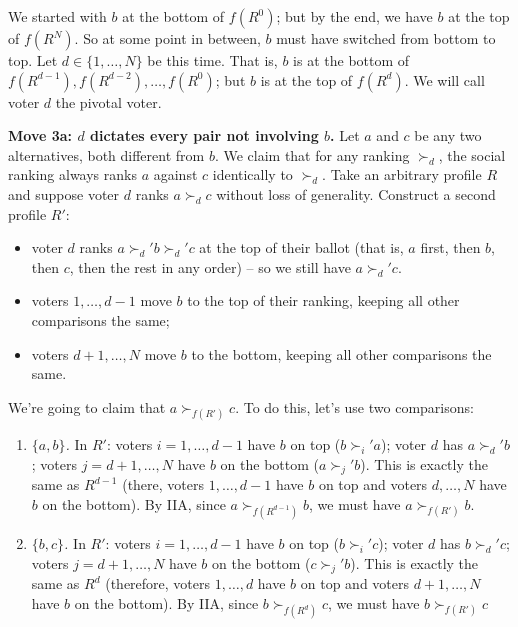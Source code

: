 \documentclass[12pt]{article}
\theoremstyle{definition}
\theoremstyle{remark}
\theoremstyle{plain}                          %
\begin{document}
We started with $b$ at the bottom of $f(R^0)$; but by the end, we have $b$ at the top of $f(R^N)$. So at some point in between, $b$ must have switched from bottom to top. Let $d \in \{1,\dots,N\}$ be this time. That is, $b$ is at the bottom of $f(R^{d-1}), f(R^{d-2}),\dots,f(R^0)$; but $b$ is at the top of $f(R^d)$. We will call voter $d$ the pivotal voter.
 
\medskip
\noindent\textbf{Move 3a: $d$ dictates every pair not involving $b$.}
Let $a$ and $c$ be any two alternatives, both different from $b$. We claim that for any ranking $\succ_d$, the social ranking always ranks $a$ against $c$ identically to $\succ_d$. Take an arbitrary profile $R$ and suppose voter $d$ ranks $a \succ_{d} c$ without loss of generality. Construct a second profile $R'$:
\begin{itemize}[nosep, topsep=3pt]
    \item voter $d$ ranks $a \succ_d' b \succ_d' c$ at the top of their ballot (that is, $a$ first, then $b$, then $c$, then the rest in any order) -- so we still have $a \succ_d' c$.
    \item voters $1,\dots,d-1$ move $b$ to the top of their ranking, keeping all other comparisons the same;
    \item voters $d+1,\dots,N$ move $b$ to the bottom, keeping all other comparisons the same.
\end{itemize}
We're going to claim that $a \succ_{f(R')} c$. To do this, let's use two comparisons:

\begin{enumerate}[nosep]
\item \emph{$\{a,b\}$.} In $R'$: voters $i=1,\dots,d-1$ have $b$ on top ($b \succ_i' a$); voter $d$ has $a \succ_d' b$; voters $j=d+1,\dots,N$ have $b$ on the bottom ($a \succ_j' b$). This is exactly the same as $R^{d-1}$ (there, voters $1,\dots,d-1$ have $b$ on top and voters $d,\dots,N$ have $b$ on the bottom). By IIA, since $a \succ_{f(R^{d-1})} b$, we must have $a \succ_{f(R')} b$.
 
\item \emph{$\{b,c\}$.} In $R'$: voters $i=1,\dots,d-1$ have $b$ on top ($b \succ_i' c$); voter $d$ has $b \succ_d' c$; voters $j=d+1,\dots,N$ have $b$ on the bottom ($c \succ_j' b$). This is exactly the same as $R^d$ (therefore, voters $1,\dots,d$ have $b$ on top and voters $d+1,\dots,N$ have $b$ on the bottom). By IIA, since $b \succ_{f(R^d)} c$, we must have $b \succ_{f(R')} c$
\end{enumerate}
 
\end{document}
